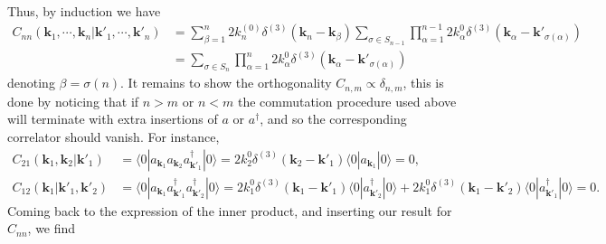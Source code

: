 Thus, by induction we have
\begin{equation}
\begin{aligned}
    C_{nn}(\mathbf{k}_1, \cdots, \mathbf{k}_n | \mathbf{k}'_1, \cdots, \mathbf{k}'_n) &= \sum_{\beta=1}^n 2k^{(0)}_n \delta^{(3)}(\mathbf{k}_n - \mathbf{k}_\beta) \sum_{\sigma \in S_{n-1}} \prod_{\alpha=1}^{n-1} 2k^0_\alpha \delta^{(3)}(\mathbf{k}_\alpha - \mathbf{k}'_{\sigma(\alpha)}) \\
    &= \sum_{\sigma \in S_n} \prod_{\alpha=1}^n 2k^0_\alpha \delta^{(3)}(\mathbf{k}_\alpha - \mathbf{k}'_{\sigma(\alpha)})
\end{aligned}
\end{equation}
denoting $\beta = \sigma(n)$.
It remains to show the orthogonality $C_{n,m} \propto \delta_{n,m}$, this is done by noticing that if $n > m$ or $n < m$ the commutation procedure used above will terminate with extra insertions of $a$ or $a^\dagger$, and so the corresponding correlator should vanish. For instance,
\begin{equation}
\begin{aligned}
    C_{21}(\mathbf{k}_1, \mathbf{k}_2 | \mathbf{k}'_1) &= \langle 0 | a_{\mathbf{k}_1} a_{\mathbf{k}_2} a^\dagger_{\mathbf{k}'_1} | 0 \rangle = 2k^0_2 \delta^{(3)}(\mathbf{k}_2 - \mathbf{k}'_1) \langle 0 | a_{\mathbf{k}_1} | 0 \rangle = 0, \\
    C_{12}(\mathbf{k}_1 | \mathbf{k}'_1, \mathbf{k}'_2) &= \langle 0 | a_{\mathbf{k}_1} a^\dagger_{\mathbf{k}'_1} a^\dagger_{\mathbf{k}'_2} | 0 \rangle = 2k^0_1 \delta^{(3)}(\mathbf{k}_1 - \mathbf{k}'_1) \langle 0 | a^\dagger_{\mathbf{k}'_2} | 0 \rangle + 2k^0_1 \delta^{(3)}(\mathbf{k}_1 - \mathbf{k}'_2) \langle 0 | a^\dagger_{\mathbf{k}'_1} | 0 \rangle = 0.
\end{aligned}
\end{equation}
Coming back to the expression of the inner product, and inserting our result for $C_{nn}$, we find
